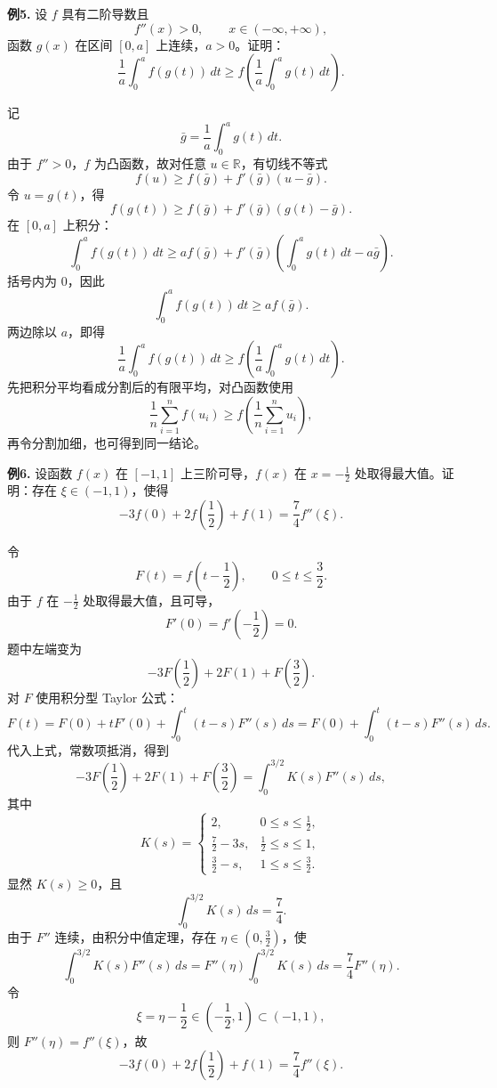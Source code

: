 \begin{problemblock}
\textbf{例5.} 设 \(f\) 具有二阶导数且
\[
f''(x)>0,\qquad x\in(-\infty,+\infty),
\]
函数 \(g(x)\) 在区间 \([0,a]\) 上连续，\(a>0\)。证明：
\[
\frac1a\int_0^a f(g(t))\,dt
\ge
f\left(\frac1a\int_0^a g(t)\,dt\right).
\]
\end{problemblock}
\begin{solutionblock}
记
\[
\bar g=\frac1a\int_0^a g(t)\,dt.
\]
由于 \(f''>0\)，\(f\) 为凸函数，故对任意 \(u\in\mathbb R\)，有切线不等式
\[
f(u)\ge f(\bar g)+f'(\bar g)(u-\bar g).
\]
令 \(u=g(t)\)，得
\[
f(g(t))\ge f(\bar g)+f'(\bar g)(g(t)-\bar g).
\]
在 \([0,a]\) 上积分：
\[
\int_0^a f(g(t))\,dt
\ge af(\bar g)+f'(\bar g)\left(\int_0^a g(t)\,dt-a\bar g\right).
\]
括号内为 \(0\)，因此
\[
\int_0^a f(g(t))\,dt\ge af(\bar g).
\]
两边除以 \(a\)，即得
\[
\frac1a\int_0^a f(g(t))\,dt
\ge
f\left(\frac1a\int_0^a g(t)\,dt\right).
\]
先把积分平均看成分割后的有限平均，对凸函数使用
\[
\frac1n\sum_{i=1}^n f(u_i)\ge f\left(\frac1n\sum_{i=1}^n u_i\right),
\]
再令分割加细，也可得到同一结论。
\end{solutionblock}

\begin{problemblock}
\textbf{例6.} 设函数 \(f(x)\) 在 \([-1,1]\) 上三阶可导，\(f(x)\) 在 \(x=-\frac12\) 处取得最大值。证明：存在 \(\xi\in(-1,1)\)，使得
\[
-3f(0)+2f\left(\frac12\right)+f(1)
=\frac74 f''(\xi).
\]
\end{problemblock}
\begin{solutionblock}
令
\[
F(t)=f\left(t-\frac12\right),\qquad 0\le t\le\frac32.
\]
由于 \(f\) 在 \(-\frac12\) 处取得最大值，且可导，
\[
F'(0)=f'\left(-\frac12\right)=0.
\]
题中左端变为
\[
-3F\left(\frac12\right)+2F(1)+F\left(\frac32\right).
\]
对 \(F\) 使用积分型 Taylor 公式：
\[
F(t)=F(0)+tF'(0)+\int_0^t (t-s)F''(s)\,ds
=F(0)+\int_0^t (t-s)F''(s)\,ds.
\]
代入上式，常数项抵消，得到
\[
-3F\left(\frac12\right)+2F(1)+F\left(\frac32\right)
=\int_0^{3/2}K(s)F''(s)\,ds,
\]
其中
\[
K(s)=
\begin{cases}
2, & 0\le s\le \frac12,\\
\frac72-3s, & \frac12\le s\le1,\\
\frac32-s, & 1\le s\le\frac32.
\end{cases}
\]
显然 \(K(s)\ge0\)，且
\[
\int_0^{3/2}K(s)\,ds=\frac74.
\]
由于 \(F''\) 连续，由积分中值定理，存在 \(\eta\in(0,\frac32)\)，使
\[
\int_0^{3/2}K(s)F''(s)\,ds
=F''(\eta)\int_0^{3/2}K(s)\,ds
=\frac74 F''(\eta).
\]
令
\[
\xi=\eta-\frac12\in\left(-\frac12,1\right)\subset(-1,1),
\]
则 \(F''(\eta)=f''(\xi)\)，故
\[
-3f(0)+2f\left(\frac12\right)+f(1)=\frac74 f''(\xi).
\]
\end{solutionblock}

